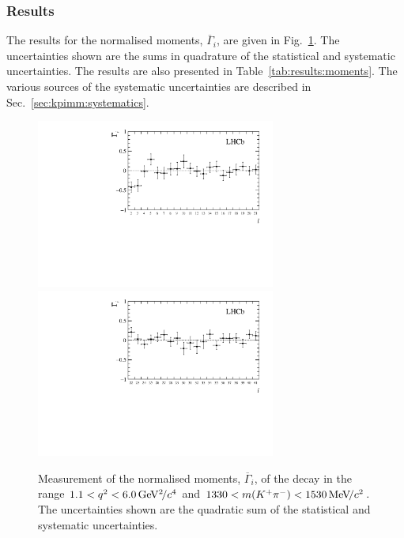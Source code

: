 \subsubsection{Results}

The results for the normalised moments, $\overline{\Gamma}_{i}$, are given in Fig.~\ref{fig:results:moments}. The uncertainties shown are the sums in quadrature of the statistical and systematic uncertainties. The results are also presented in Table~\ref{tab:results:moments}. The various sources of the systematic uncertainties are described in Sec.~\ref{sec:kpimm:systematics}.

\begin{figure}[!tb]
\centering
  \includegraphics[width=0.7\textwidth]{figs/kpimm/angular-analysis/mom_results_2_21.pdf}
  \includegraphics[width=0.7\textwidth]{figs/kpimm/angular-analysis/mom_results_22_41.pdf}
  \caption{Measurement of the normalised moments, $\overline{\Gamma}_{i}$, of the decay \BdToKpimm in the range $1.1<{q^2}<6.0{\mathrm{\,Ge\kern -0.1em V^2\!/}c^4}$ and $1330<m({{K}^+}{{\pi}^-})<1530{\mathrm{\,Me\kern -0.1em V\!/}c^2}$. The uncertainties shown are the quadratic sum of the statistical and systematic uncertainties.}
  \label{fig:results:moments}
\end{figure}

